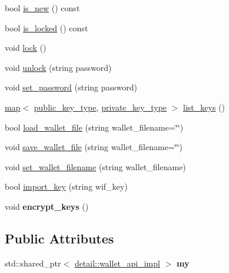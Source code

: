\begin{DoxyCompactItemize}
\item 
bool \mbox{\hyperlink{classaacio_1_1wallet_1_1wallet__api_a1e1cc3ffe35685070738d34d3a8778d9}{is\+\_\+new}} () const
\item 
bool \mbox{\hyperlink{classaacio_1_1wallet_1_1wallet__api_aae6a962628df3f49cacaf2239ef0f11c}{is\+\_\+locked}} () const
\item 
void \mbox{\hyperlink{classaacio_1_1wallet_1_1wallet__api_a12f7c1fefda15e09c58c6622d9f1a32c}{lock}} ()
\item 
void \mbox{\hyperlink{classaacio_1_1wallet_1_1wallet__api_a80992e6f10f3172bd514d10287a69420}{unlock}} (string password)
\item 
void \mbox{\hyperlink{classaacio_1_1wallet_1_1wallet__api_a9b9c6db62baab3c4f2476823573d57ce}{set\+\_\+password}} (string password)
\item 
\mbox{\hyperlink{classstd_1_1map}{map}}$<$ \mbox{\hyperlink{classfc_1_1crypto_1_1public__key}{public\+\_\+key\+\_\+type}}, \mbox{\hyperlink{classfc_1_1crypto_1_1private__key}{private\+\_\+key\+\_\+type}} $>$ \mbox{\hyperlink{classaacio_1_1wallet_1_1wallet__api_ac6a84d9a87666891359fc655e0fc7bfc}{list\+\_\+keys}} ()
\item 
bool \mbox{\hyperlink{classaacio_1_1wallet_1_1wallet__api_a0310fe9e8bf96ab696b6c2919516ba1f}{load\+\_\+wallet\+\_\+file}} (string wallet\+\_\+filename=\char`\"{}\char`\"{})
\item 
void \mbox{\hyperlink{classaacio_1_1wallet_1_1wallet__api_a8fc5732ef94628ef71d52bf244e70172}{save\+\_\+wallet\+\_\+file}} (string wallet\+\_\+filename=\char`\"{}\char`\"{})
\item 
void \mbox{\hyperlink{classaacio_1_1wallet_1_1wallet__api_a208875f33af3cb0ec88e316c813f0ec8}{set\+\_\+wallet\+\_\+filename}} (string wallet\+\_\+filename)
\item 
bool \mbox{\hyperlink{classaacio_1_1wallet_1_1wallet__api_aa59ff70f12bd8dd9fa1d63cb3be09089}{import\+\_\+key}} (string wif\+\_\+key)
\item 
\mbox{\label{classaacio_1_1wallet_1_1wallet__api_a31b2ff23dbaedcc6035d0543eade3ed8}} 
void {\bfseries encrypt\+\_\+keys} ()
\end{DoxyCompactItemize}
\subsection*{Public Attributes}
\begin{DoxyCompactItemize}
\item 
\mbox{\label{classaacio_1_1wallet_1_1wallet__api_a34500619638bb333095fdf2b5f8b10de}} 
std\+::shared\+\_\+ptr$<$ \mbox{\hyperlink{classaacio_1_1wallet_1_1detail_1_1wallet__api__impl}{detail\+::wallet\+\_\+api\+\_\+impl}} $>$ {\bfseries my}
\end{DoxyCompactItemize}


